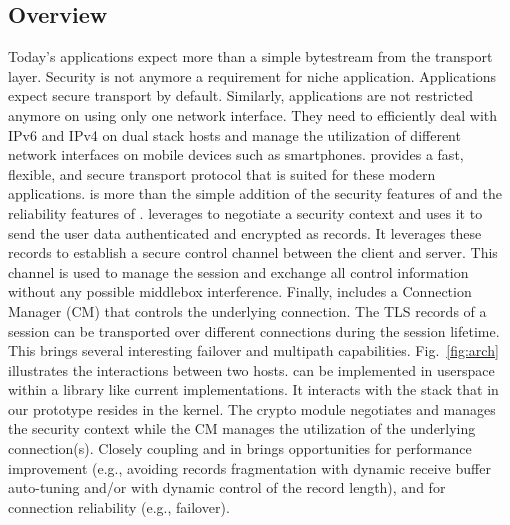 



\subsection{Overview}
Today's applications expect more than a simple bytestream from the transport
layer. Security is not anymore a requirement for niche application. Applications
expect secure transport by default. Similarly, applications are not restricted
anymore on using only one network interface. They need to efficiently deal with
IPv6 and IPv4 on dual stack hosts and manage the utilization of different
network interfaces on mobile devices such as smartphones. \tcpls provides a
fast, flexible, and secure transport protocol that is suited for these modern
applications. \tcpls is more than the simple addition of the security features
of \tls and the reliability features of \tcp. \tcpls leverages  to
negotiate a security context and uses it to send the user data authenticated and
encrypted as \tls records. It leverages these records to establish a secure
control channel between the client and server. This channel is used to manage
the \tcpls session and exchange all control information without any possible
middlebox interference. Finally, \tcpls includes a Connection Manager (CM) that
controls the underlying \tcp connection. The TLS records of a \tcpls session can
be transported over different \tcp connections during the session lifetime. This
brings several interesting failover and multipath capabilities.
Fig.~\ref{fig:arch} illustrates the interactions between two \tcpls hosts.
\tcpls can be implemented in userspace within a library like current \tls
implementations. It interacts with the \tcp stack that in our prototype resides
in the kernel. The crypto module negotiates and manages the security context
while the CM manages the utilization of the underlying \tcp connection(s). Closely coupling \tcp and \tls in \tcpls brings opportunities for performance improvement (e.g., avoiding records fragmentation with dynamic receive buffer auto-tuning and/or with dynamic control of the record length), and for connection reliability (e.g., failover).



